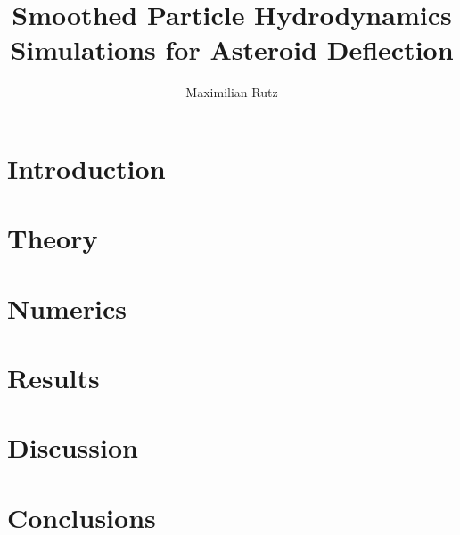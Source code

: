 \documentclass{article}
\title{Smoothed Particle Hydrodynamics Simulations for Asteroid Deflection}
\author{Maximilian Rutz}
\date{}
\begin{document}
\maketitle
\begin{abstract}
    
\end{abstract}

\newpage
\tableofcontents

\newpage
\section{Introduction}

\section{Theory}

\section{Numerics}

\section{Results}

\section{Discussion}

\section{Conclusions}


\newpage
\printbibliography
\end{document}

